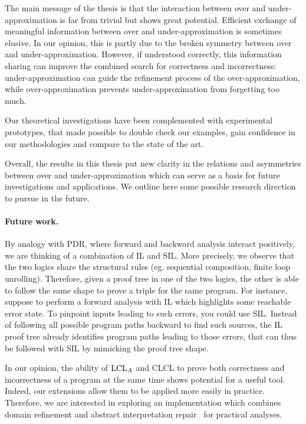 The main message of the thesis is that the interaction between over and under-approximation is far from trivial but shows great potential. Efficient exchange of meaningful information between over and under-approximation is sometimes elusive. In our opinion, this is partly due to the broken symmetry between over and under-approximation. However, if understood correctly, this information sharing can improve the combined search for correctness and incorrectness: under-approximation can guide the refinement process of the over-approximation, while over-approximation prevents under\hyp{}approximation from forgetting too much.

Our theoretical investigations have been complemented with experimental prototypes, that made possible to double check our examples, gain confidence in our methodologies and compare to the state of the art.

Overall, the results in this thesis put new clarity in the relations and asymmetries between over and under-approximation which can serve as a basis for future investigations and applications. We outline here some possible research direction to pursue in the future.

\paragraph*{Future work.}
By analogy with PDR, where forward and backward analysis interact positively, we are thinking of a combination of IL and SIL. More precisely, we observe that the two logics share the structural rules (eg. sequential composition, finite loop unrolling). Therefore, given a proof tree in one of the two logics, the other is able to follow the same shape to prove a triple for the same program.
For instance, suppose to perform a forward analysis with IL which highlights some reachable error state. To pinpoint inputs leading to such errors, you could use SIL. Instead of following all possible program paths backward to find such sources, the IL proof tree already identifies program paths leading to those errors, that can thus be followed with SIL by mimicking the proof tree shape.

In our opinion, the ability of $\text{LCL}_A$ and CLCL to prove both correctness and incorrectness of a program at the same time shows potential for a useful tool. Indeed, our extensions allow them to be applied more easily in practice. Therefore, we are interested in exploring an implementation which combines domain refinement and abstract interpretation repair~\cite{BGGR22} for practical analyses.

